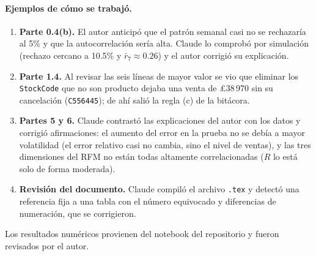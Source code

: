 \documentclass[11pt]{article}
\begin{document}
\paragraph{Ejemplos de cómo se trabajó.}
\begin{enumerate}
  \item \textbf{Parte 0.4(b).} El autor anticipó que el patrón semanal casi no se rechazaría al 5\% y que la autocorrelación sería alta. Claude lo comprobó por simulación (rechazo cercano a 10.5\% y $\bar r_7\approx0.26$) y el autor corrigió su explicación.
  \item \textbf{Parte 1.4.} Al revisar las seis líneas de mayor valor se vio que eliminar los \texttt{StockCode} que no son producto dejaba una venta de \pounds{}38\,970 sin su cancelación (\texttt{C556445}); de ahí salió la regla (c) de la bitácora.
  \item \textbf{Partes 5 y 6.} Claude contrastó las explicaciones del autor con los datos y corrigió afirmaciones: el aumento del error en la prueba no se debía a mayor volatilidad (el error relativo casi no cambia, sino el nivel de ventas), y las tres dimensiones del RFM no están todas altamente correlacionadas ($R$ lo está solo de forma moderada).
  \item \textbf{Revisión del documento.} Claude compiló el archivo \texttt{.tex} y detectó una referencia fija a una tabla con el número equivocado y diferencias de numeración, que se corrigieron.
\end{enumerate}
  
Los resultados numéricos provienen del notebook del repositorio y fueron revisados por el autor.
 
\end{document}
